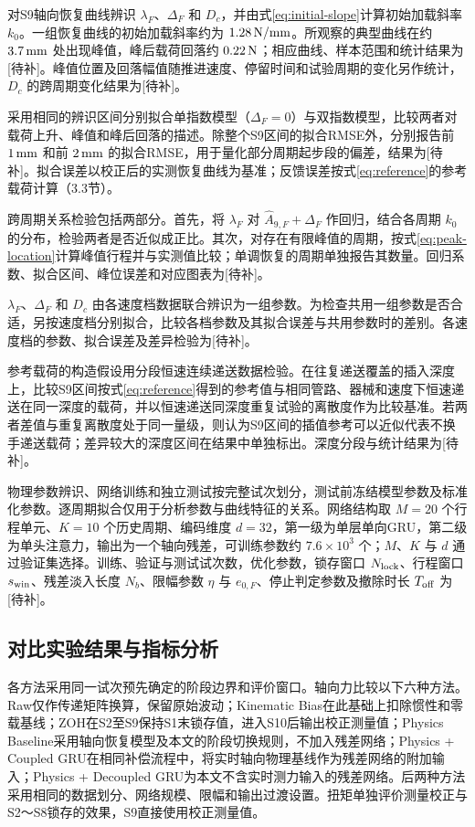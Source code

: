 \documentclass{JQRnew}
\providecommand{\RevisionColor}{\color{black}}
\newcommand{\revbegin}{\begingroup\RevisionColor}
\newcommand{\revend}{\par\endgroup}
\begin{document}
\revbegin
对S9轴向恢复曲线辨识 $\lambda_F$、$\Delta_F$ 和 $D_c$，并由式\eqref{eq:initial-slope}计算初始加载斜率 $k_0$。一组恢复曲线的初始加载斜率约为 $1.28\,{\rm N/mm}$。所观察的典型曲线在约 $3.7\,{\rm mm}$ 处出现峰值，峰后载荷回落约 $0.22\,{\rm N}$；相应曲线、样本范围和统计结果为[待补]。峰值位置及回落幅值随推进速度、停留时间和试验周期的变化另作统计，$D_c$ 的跨周期变化结果为[待补]。
\revend

采用相同的辨识区间分别拟合单指数模型（$\Delta_F=0$）与双指数模型，比较两者对载荷上升、峰值和峰后回落的描述。除整个S9区间的拟合RMSE外，分别报告前 $1\,{\rm mm}$ 和前 $2\,{\rm mm}$ 的拟合RMSE，用于量化部分周期起步段的偏差，结果为[待补]。拟合误差以校正后的实测恢复曲线为基准；反馈误差按式\eqref{eq:reference}的参考载荷计算（3.3节）。

\revbegin
跨周期关系检验包括两部分。首先，将 $\lambda_F$ 对 $\widehat A_{9,F}+\Delta_F$ 作回归，结合各周期 $k_0$ 的分布，检验两者是否近似成正比。其次，对存在有限峰值的周期，按式\eqref{eq:peak-location}计算峰值行程并与实测值比较；单调恢复的周期单独报告其数量。回归系数、拟合区间、峰位误差和对应图表为[待补]。
\revend

$\lambda_F$、$\Delta_F$ 和 $D_c$ 由各速度档数据联合辨识为一组参数。为检查共用一组参数是否合适，另按速度档分别拟合，比较各档参数及其拟合误差与共用参数时的差别。各速度档的参数、拟合误差及差异检验为[待补]。

参考载荷的构造假设用分段恒速连续递送数据检验。在往复递送覆盖的插入深度上，比较S9区间按式\eqref{eq:reference}得到的参考值与相同管路、器械和速度下恒速递送在同一深度的载荷，并以恒速递送同深度重复试验的离散度作为比较基准。若两者差值与重复离散度处于同一量级，则认为S9区间的插值参考可以近似代表不换手递送载荷；差异较大的深度区间在结果中单独标出。深度分段与统计结果为[待补]。

物理参数辨识、网络训练和独立测试按完整试次划分，测试前冻结模型参数及标准化参数。逐周期拟合仅用于分析参数与曲线特征的关系。网络结构取 $M=20$ 个行程单元、$K=10$ 个历史周期、编码维度 $d=32$，第一级为单层单向GRU，第二级为单头注意力，输出为一个轴向残差，可训练参数约 $7.6\times10^3$ 个；$M$、$K$ 与 $d$ 通过验证集选择。训练、验证与测试试次数，优化参数，锁存窗口 $N_{\rm lock}$、行程窗口 $s_{\rm win}$、残差淡入长度 $N_b$、限幅参数 $\eta$ 与 $e_{0,F}$、停止判定参数及撤除时长 $T_{\rm off}$ 为[待补]。

\subsection{对比实验结果与指标分析}

各方法采用同一试次预先确定的阶段边界和评价窗口。轴向力比较以下六种方法。Raw仅作传递矩阵换算，保留原始波动；Kinematic Bias在此基础上扣除惯性和零载基线；ZOH在S2至S9保持S1末锁存值，进入S10后输出校正测量值；Physics Baseline采用轴向恢复模型及本文的阶段切换规则，不加入残差网络；Physics + Coupled GRU在相同补偿流程中，将实时轴向物理基线作为残差网络的附加输入；Physics + Decoupled GRU为本文不含实时测力输入的残差网络。后两种方法采用相同的数据划分、网络规模、限幅和输出过渡设置。扭矩单独评价测量校正与S2～S8锁存的效果，S9直接使用校正测量值。
\end{document}
